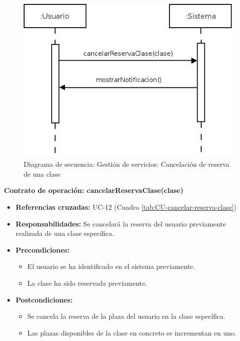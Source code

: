 \begin{figure}[h!]
\centering
  \includegraphics[scale=.55]{img/secuencias/gestion-servicios-cancelar-reserva-clase.jpeg}
  \caption{Diagrama de secuencia: Gestión de servicios: Cancelación de reserva de una clase}
  \label{fig:secuencia-gestion-servicios-cancelar-reserva-clase}
\end{figure}

\textbf{Contrato de operación: cancelarReservaClase(clase)}
\begin{itemize}
\item \textbf{Referencias cruzadas:} UC-12 (Cuadro \ref{tab:CU-cancelar-reserva-clase})
\item \textbf{Responsabilidades:} Se cancelará la reserva del usuario previamente realizada de una clase específica.
\item \textbf{Precondiciones:} 
 \begin{itemize}
\item El usuario se ha identificado en el sistema previamente.
\item La clase ha sido reservada previamente.
\end {itemize}
\item \textbf{Postcondiciones:} 
 \begin{itemize}
\item Se cancela la reserva de la plaza del usuario en la clase específica.
\item Las plazas disponibles de la clase en concreto se incrementan en uno.
\end {itemize}
\end {itemize}

